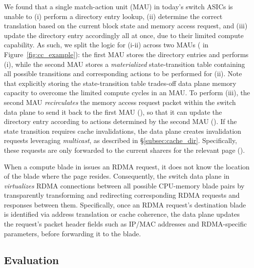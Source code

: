  We found that a single match-action unit (MAU) in today's switch ASICs is unable to (i) perform a directory entry lookup, (ii) determine the correct translation based on the current block state and memory access request, and (iii) update the directory entry accordingly all at once, due to their limited compute capability. As such, we split the logic for (i-ii) across two MAUs ( in Figure~\ref{fig:cc_example}): the first MAU stores the directory entries and performs (i), while the second MAU stores a \textit{materialized} state-transition table containing all possible transitions and corresponding actions to be performed for (ii). Note that explicitly storing the state-transition table trades-off data plane memory capacity to overcome the limited compute cycles in an MAU. To perform (iii), the second MAU \textit{recirculates} the memory access request packet within the switch data plane to send it back to the first MAU (), so that it can update the directory entry according to actions determined by the second MAU (). If the state transition requires cache invalidations, the data plane creates invalidation requests leveraging \textit{multicast}, as described in \S\ref{subsec:cache_dir}. Specifically, these requests are only forwarded to the current sharers for the relevant page ().

 When a compute blade in \mind issues an RDMA request, it does not know the location of the blade where the page resides. Consequently, the switch data plane in \mind \textit{virtualizes} RDMA connections between all possible CPU-memory blade pairs by transparently transforming and redirecting corresponding RDMA requests and responses between them. Specifically, once an RDMA request's destination blade is identified via address translation or cache coherence, the data plane updates the request's packet header fields such as IP/MAC addresses and RDMA-specific parameters, before forwarding it to the blade.

\subsection{Evaluation}
\label{ssec:mindevaluation}

